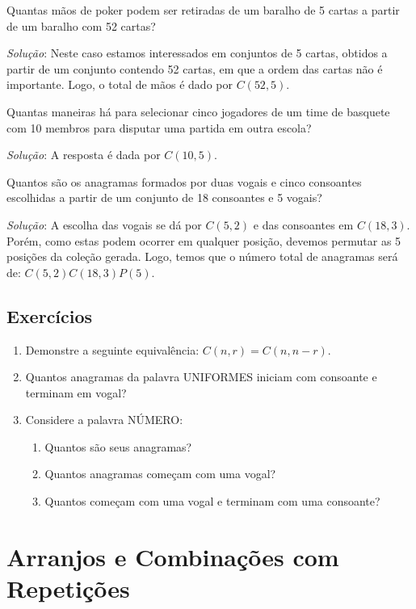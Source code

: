 \begin{Example}
Quantas mãos de poker podem ser retiradas de um baralho de 5 cartas a
partir de um baralho com 52 cartas?

\textit{Solução}: Neste caso estamos interessados em conjuntos de 5
cartas, obtidos a partir de um conjunto contendo 52 cartas, em que a
ordem das cartas não é importante. Logo, o total de mãos é dado por $C(52,5)$.
\end{Example}

\begin{Example}
Quantas maneiras há para selecionar cinco jogadores de um time de
basquete com 10 membros para disputar uma partida em outra escola?

\textit{Solução}: A resposta é dada por $C(10,5)$.
\end{Example}

\begin{Example}
  Quantos são os anagramas formados por duas vogais e cinco consoantes
  escolhidas a partir de um conjunto de 18 consoantes e 5 vogais?

\textit{Solução}: A escolha das vogais se dá por $C(5,2)$ e das
consoantes em $C(18,3)$. Porém, como estas podem ocorrer em qualquer
posição, devemos permutar as 5 posições da coleção gerada. Logo, temos
que o número total de anagramas será de: $C(5,2)C(18,3)P(5)$.
\end{Example}

\subsection{Exercícios}

\begin{enumerate}
  \item Demonstre a seguinte equivalência: $C(n,r) = C(n,n - r)$.
   \item Quantos anagramas da palavra UNIFORMES iniciam com consoante
     e terminam em vogal?
  \item Considere a palavra NÚMERO:
  \begin{enumerate}
    \item Quantos são seus anagramas?
    \item Quantos anagramas começam com uma vogal?
    \item Quantos começam com uma vogal e terminam com uma consoante?
  \end{enumerate}
\end{enumerate}

\section{Arranjos e Combinações com Repetições}

